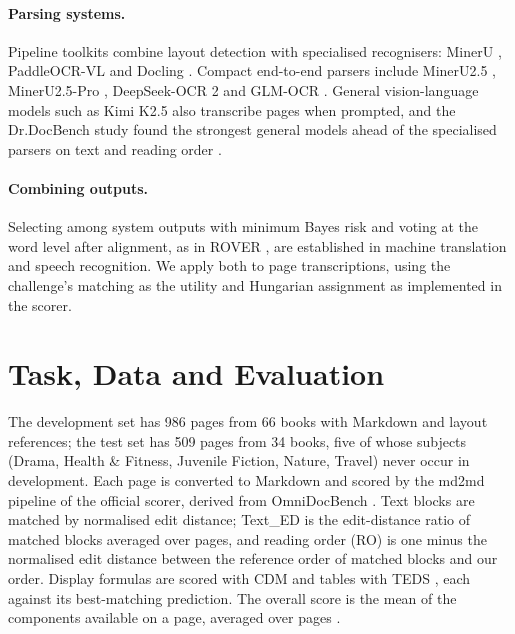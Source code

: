 \documentclass[11pt]{article}
\newcommand{\ted}{Text\_ED}
\newcommand{\ro}{RO}
\begin{document}
\paragraph{Parsing systems.} Pipeline toolkits combine layout detection with specialised recognisers: MinerU \citep{mineru}, PaddleOCR-VL \citep{paddleocrvl, paddleocrvl15} and Docling \citep{docling}. Compact end-to-end parsers include MinerU2.5 \citep{mineru25}, MinerU2.5-Pro \citep{mineru25pro}, DeepSeek-OCR 2 \citep{deepseekocr2} and GLM-OCR \citep{glmocr}. General vision-language models such as Kimi K2.5 \citep{kimik25} also transcribe pages when prompted, and the Dr.DocBench study found the strongest general models ahead of the specialised parsers on text and reading order \citep{drdocbench}.

\paragraph{Combining outputs.} Selecting among system outputs with minimum Bayes risk \citep{kumar-byrne-2004-minimum} and voting at the word level after alignment, as in ROVER \citep{fiscus1997rover}, are established in machine translation and speech recognition. We apply both to page transcriptions, using the challenge's matching as the utility and Hungarian assignment \citep{scipy} as implemented in the scorer.

\section{Task, Data and Evaluation}
\label{sec:task}
The development set has 986 pages from 66 books with Markdown and layout references; the test set has 509 pages from 34 books, five of whose subjects (Drama, Health \& Fitness, Juvenile Fiction, Nature, Travel) never occur in development. Each page is converted to Markdown and scored by the md2md pipeline of the official scorer, derived from OmniDocBench \citep{omnidocbench}. Text blocks are matched by normalised edit distance; \ted{} is the edit-distance ratio of matched blocks averaged over pages, and reading order (\ro) is one minus the normalised edit distance between the reference order of matched blocks and our order. Display formulas are scored with CDM \citep{cdm} and tables with TEDS \citep{teds}, each against its best-matching prediction. The overall score is the mean of the components available on a page, averaged over pages \citep{drdocbench}.
\end{document}
